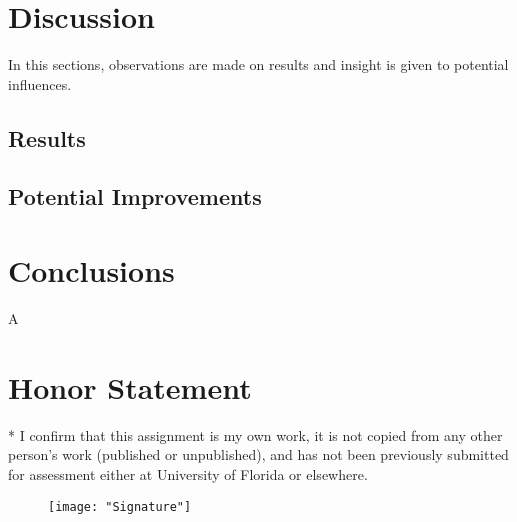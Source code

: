 \documentclass[conference]{IEEEtran}
\begin{document}

\section{Discussion} \label{Discussion}
In this sections, observations are made on results and insight is given to potential influences.

\subsection{Results}



\subsection{Potential Improvements}



\section{Conclusions} \label{Conclusions}
A

\section*{Honor Statement}
\noindent
* I confirm that this assignment is my own work, it is not copied from any other person's work (published or unpublished), and has not been previously submitted for assessment either at University of Florida or elsewhere.

\begin{figure}[h!]
	\centering
	\texttt{[image: "Signature"]}
\end{figure}
\end{document}
